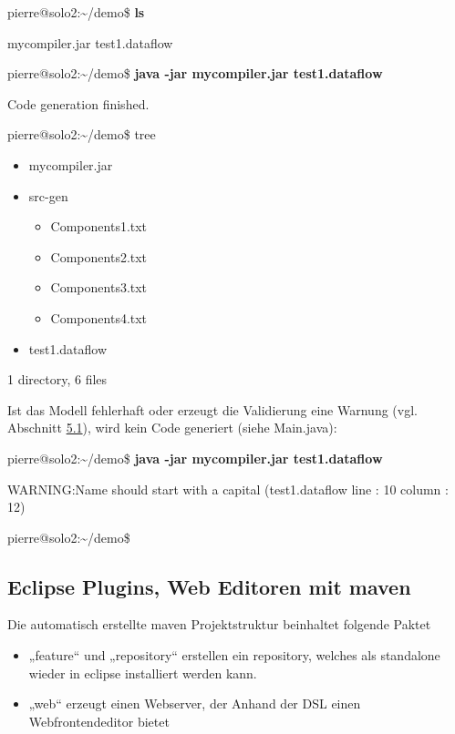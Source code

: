 \documentclass[a4]{article}
\providecommand{\tightlist}{%
  \setlength{\itemsep}{0pt}\setlength{\parskip}{0pt}}
\begin{document}
pierre@solo2:\textasciitilde{}/demo\$ \textbf{ls}

mycompiler.jar test1.dataflow

pierre@solo2:\textasciitilde{}/demo\$ \textbf{java -jar mycompiler.jar
test1.dataflow }

Code generation finished.

pierre@solo2:\textasciitilde{}/demo\$ tree

\begin{itemize}
\item mycompiler.jar
\item src-gen
\begin{itemize}
\item Components1.txt
\item Components2.txt
\item Components3.txt
\item Components4.txt
\end{itemize}
\item test1.dataflow
\end{itemize}
1 directory, 6 files

Ist das Modell fehlerhaft oder erzeugt die Validierung eine Warnung
(vgl. Abschnitt \protect\hyperlink{anchor-30}{5.1}), wird kein Code
generiert (siehe Main.java):

pierre@solo2:\textasciitilde{}/demo\$ \textbf{java -jar mycompiler.jar
test1.dataflow }

WARNING:Name should start with a capital (test1.dataflow line : 10
column : 12)

pierre@solo2:\textasciitilde{}/demo\$

\subsection[Eclipse Plugins, Web Editoren mit
maven]{\texorpdfstring{\protect\hypertarget{anchor-51}{}{}Eclipse
Plugins, Web Editoren mit
maven}{Eclipse Plugins, Web Editoren mit maven}}\label{eclipse-plugins-web-editoren-mit-maven}

Die automatisch erstellte maven Projektstruktur beinhaltet folgende
Paktet

\begin{itemize}
\tightlist
\item
  „feature`` und „repository`` erstellen ein repository, welches als
  standalone wieder in eclipse installiert werden kann. 
\item
  „web`` erzeugt einen Webserver, der Anhand der DSL einen
  Webfrontendeditor bietet
\end{itemize}
\end{document}
